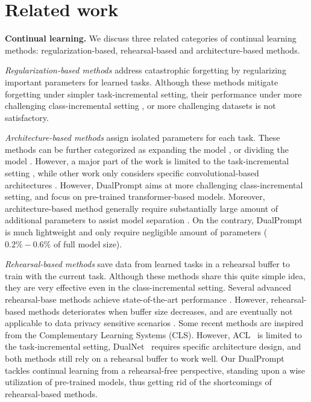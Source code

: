 \documentclass[runningheads]{llncs}
\newcommand{\method}{DualPrompt\xspace}
\begin{document}
\section{Related work}
\textbf{Continual learning.} We discuss three related categories of continual learning methods: regularization-based, rehearsal-based and architecture-based methods.

\textit{Regularization-based methods} \cite{kirkpatrick2017overcoming,zenke2017continual,li2017learning,aljundi2018memory} address catastrophic forgetting by regularizing important parameters for learned tasks. Although these methods mitigate forgetting under simpler task-incremental setting, their performance under more challenging class-incremental setting \cite{mai2021online}, or more challenging datasets \cite{wu2019large} is not satisfactory.

\textit{Architecture-based methods} assign isolated parameters for each task. These methods can be further categorized as expanding the model \cite{rusu2016progressive,yoon2017lifelong,li2019learn,loo2020generalized,zhao2022deep}, or dividing the model \cite{mallya2018packnet,serra2018overcoming,wang2020learn,ke2020continual,ebrahimi2020adversarial}. However, a major part of the work is limited to the task-incremental setting \cite{serra2018overcoming,mallya2018packnet,mallya2018piggyback,ke2020continual}, while other work only considers specific convolutional-based architectures \cite{wortsman2020supermasks,pham2020contextual,ebrahimi2020adversarial}. However, \method aims at more challenging class-incremental setting, and focus on pre-trained transformer-based models. Moreover, architecture-based method generally require substantially large amount of additional parameters to assist model separation \cite{wang2020learn,ke2020continual,yan2021dynamically}. On the contrary, \method is much lightweight and only require negligible amount of parameters ($0.2\% - 0.6\%$ of full model size).

\textit{Rehearsal-based methods} save data from learned tasks in a rehearsal buffer to train with the current task. Although these methods share this quite simple idea, they are very effective even in the class-incremental setting. Several advanced rehearsal-base methods achieve state-of-the-art performance \cite{buzzega2020dark,cha2021co2l}. However, rehearsal-based methods deteriorates when buffer size \cite{cha2021co2l} decreases, and are eventually not applicable to data privacy sensitive scenarios \cite{shokri2015privacy}. 
Some recent methods are inspired from the Complementary Learning Systems (CLS). However, ACL~\cite{ebrahimi2020adversarial} is limited to the task-incremental setting, DualNet~\cite{pham2021dualnet} requires specific architecture design, and both methods still rely on a rehearsal buffer to work well.
Our \method tackles continual learning from a rehearsal-free perspective, standing upon a wise utilization of pre-trained models, thus getting rid of the shortcomings of rehearsal-based methods.
\end{document}

